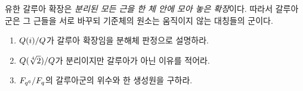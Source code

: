 \begin{keyidea}
유한 갈루아 확장은 \emph{분리된 모든 근을 한 체 안에 모아 놓은 확장}이다. 따라서 갈루아군은 그 근들을 서로 바꾸되 기준체의 원소는 움직이지 않는 대칭들의 군이다.
\end{keyidea}

\begin{checkpoint}
\begin{enumerate}[label=(\alph*)]
  \item $Q(i)/Q$가 갈루아 확장임을 분해체 판정으로 설명하라.
  \item $Q(\sqrt[4]{2})/Q$가 분리이지만 갈루아가 아닌 이유를 적어라.
  \item $F_{q^6}/F_q$의 갈루아군의 위수와 한 생성원을 구하라.
\end{enumerate}
\end{checkpoint}
